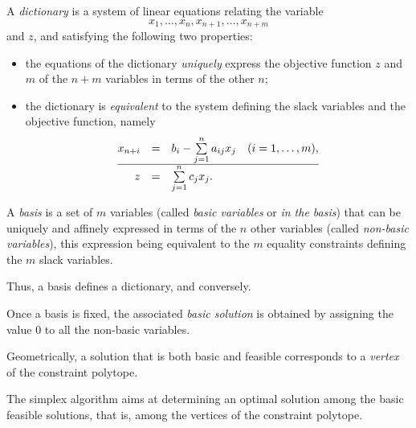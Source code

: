 \begin{definition}
    A \emph{dictionary} is a system of linear equations relating the variable
    \[
        x_1,\dots,x_n,x_{n+1},\dots,x_{n+m}
    \]
    and $z$, and satisfying the following two properties:
    \begin{itemize}
        \item the equations of the dictionary \emph{uniquely} express the objective function $z$ and $m$ of the $n+m$ variables in terms of the other $n$;
        \item the dictionary is \emph{equivalent} to the system defining the slack variables and the objective function, namely
    \[
        \begin{array}{@{}rcl@{}}   
        x_{n+i} &=&b_i - \sum\limits_{j=1}^n a_{ij}x_j \quad (i=1,\dots,m),\\
        \hline z &=& \sum\limits_{j=1}^n c_j x_j .
        \end{array}
    \]
    \end{itemize}
\end{definition}

\begin{definition}[Basis]\label{def:base}
    A \emph{basis} is a set of $m$ variables (called \emph{basic variables} or \emph{in the basis}) that can be uniquely and affinely expressed in terms of the $n$ other variables (called \emph{non-basic variables}), this expression being equivalent to the $m$ equality constraints defining the $m$ slack variables.
\end{definition}

\begin{remark}
    Thus, a basis defines a dictionary, and conversely.
\end{remark}

\begin{definition}
    Once a basis is fixed, the associated \emph{basic solution} is obtained by assigning the value $0$ to all the non-basic variables.
\end{definition}

\begin{remark}
    Geometrically, a solution that is both basic and feasible corresponds to a \emph{vertex} of the constraint polytope. 
    
    The simplex algorithm aims at determining an optimal solution among the basic feasible solutions, that is, among the vertices of the constraint polytope.
\end{remark}

